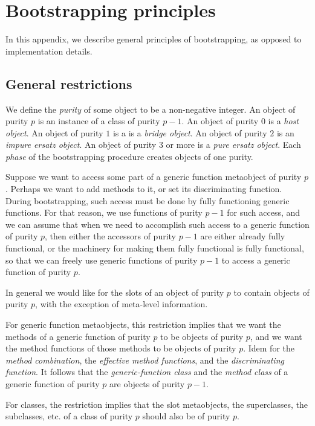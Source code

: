 \chapter{Bootstrapping principles}

In this appendix, we describe general principles of bootstrapping, as
opposed to implementation details.

\section{General restrictions}

We define the \emph{purity} of some object to be a non-negative
integer.  An object of purity $p$ is an instance of a class of purity
$p-1$.  An object of purity $0$ is a \emph{host object}.  An object of
purity $1$ is a is a \emph{bridge object}.  An object of purity $2$ is
an \emph{impure ersatz object}.  An object of purity $3$ or more is a
\emph{pure ersatz object}.  Each \emph{phase} of the bootstrapping
procedure creates objects of one purity.

Suppose we want to access some part of a generic function metaobject
of purity $p$.  Perhaps we want to add methods to it, or set its
discriminating function.  During bootstrapping, such access must be
done by fully functioning generic functions.  For that reason, we use
functions of purity $p-1$ for such access, and we can assume that when
we need to accomplish such access to a generic function of purity $p$,
then either the accessors of purity $p-1$ are either already fully
functional, or the machinery for making them fully functional is fully
functional, so that we can freely use generic functions of purity
$p-1$ to access a generic function of purity $p$.

In general we would like for the slots of an object of purity $p$ to
contain objects of purity $p$, with the exception of meta-level
information.

For generic function metaobjects, this restriction implies that we
want the methods of a generic function of purity $p$ to be objects of
purity $p$, and we want the method functions of those methods to be
objects of purity $p$.  Idem for the \emph{method combination}, the
\emph{effective method functions}, and the \emph{discriminating
  function}.  It follows that the \emph{generic-function class} and
the \emph{method class} of a generic function of purity $p$ are
objects of purity $p-1$.

For classes, the restriction implies that the slot metaobjects, the
superclasses, the subclasses, etc. of a class of purity $p$ should
also be of purity $p$.


